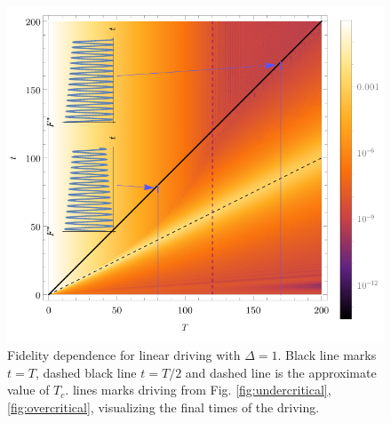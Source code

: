 \begin{figure}[H]
    \centering 
    \includegraphics[scale=1.2]{../img/allInOne.pdf}
    \caption{Fidelity dependence for linear driving with $\Delta=1$. Black line marks $t=T$, dashed black line $t=T/2$ and  dashed line is the approximate value of $T_c$.  lines marks driving from Fig. \ref{fig:undercritical}, \ref{fig:overcritical}, visualizing the final times of the driving.}
    \label{fig:AllInOne}
\end{figure}









\newpage
